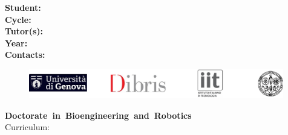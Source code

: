 \NewDocumentCommand{\addPersonalData}{}
{
	\begin{flushleft}
		\vspace{1.5cm}
		\large{\textbf{Student:~}}\large{{\getStudentName}}\vspace{0.2cm}\\
		\large{\textbf{Cycle:~}}\large{\getCycle}\vspace{0.2cm}\\
		\large{\textbf{Tutor(s):~}}\large{{\getTutorsList}}\vspace{0.2cm}\\
		\large{\textbf{Year:~}}\large{\getYear}\vspace{0.2cm}\\
		\large{\textbf{Contacts:~}}\large{\getContactsList}
	\end{flushleft}
}

\NewDocumentCommand{\addResearchProjTitle}{}
{
	\begin{center}
		\textbf{\normalsize{\getProjName}}
	\end{center}
}

\NewDocumentCommand{\addTopLogos}{}
{
	\begin{figure}[t]
		\centering
		\includegraphics[width=0.99\textwidth]{logos/top_logos.pdf}
	\end{figure}
	\hphantom{h}\vspace{1.3cm}
}

\NewDocumentCommand{\addTitlePage}{}
{
	\addTopLogos
	
	\begin{center}
		
		\LARGE{\textbf{Doctorate~in~Bioengineering~and~Robotics }\vspace{0.4cm}\\
			Curriculum:~\getCurriculumName}
		
	\end{center}
	
	\addPersonalData %
	
	\clearpage
}

\ExplSyntaxOff
